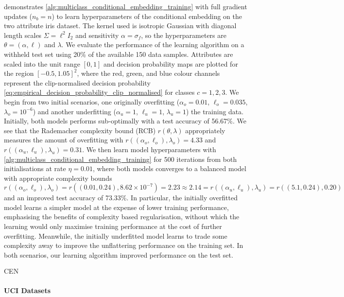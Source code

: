 \documentclass[twoside]{article}
\begin{document}
	 demonstrates \cref{alg:multiclass_conditional_embedding_training} with full gradient updates ($n_{b} = n$) to learn hyperparameters of the conditional embedding on the two attribute iris dataset. The kernel used is isotropic Gaussian with diagonal length scales $\Sigma = \ell^{2} I_{2}$ and sensitivity $\alpha = \sigma_{f}$, so the hyperparameters are $\theta = (\alpha, \ell)$ and $\lambda$. We evaluate the performance of the learning algorithm on a withheld test set using 20\% of the available 150 data samples. Attributes are scaled into the unit range $[0, 1]$ and decision probability maps are plotted for the region $[-0.5, 1.05]^{2}$, where the red, green, and blue colour channels represent the clip-normalised decision probability \eqref{eq:empirical_decision_probability_clip_normalised} for classes $c = 1, 2, 3$. We begin from two initial scenarios, one originally overfitting ($\alpha_{o} = 0.01$, $\ell_{o} = 0.035$, $\lambda_{o} = 10^{-6}$) and another underfitting ($\alpha_{u} = 1$, $\ell_{u} = 1$, $\lambda_{u} = 1$) the training data. Initially, both models performs sub-optimally with a test accuracy of 56.67\%. We see that the Rademacher complexity bound (RCB) $r(\theta, \lambda)$ appropriately measures the amount of overfitting with $r((\alpha_{o}, \ell_{o}), \lambda_{o}) = 4.33$ and $r((\alpha_{u}, \ell_{u}), \lambda_{u}) = 0.31$. We then learn model hyperparameters with \cref{alg:multiclass_conditional_embedding_training} for 500 iterations from both initialisations at rate $\eta = 0.01$, where both models converges to a balanced model with appropriate complexity bounds $r((\alpha_{o}, \ell_{o}), \lambda_{o}) = r((0.01, 0.24), 8.62 \times 10^{-7}) = 2.23 \approx 2.14 = r((\alpha_{u}, \ell_{u}), \lambda_{u}) = r((5.1, 0.24), 0.20)$ and an improved test accuracy of 73.33\%. In particular, the initially overfitted model learns a simpler model at the expense of lower training performance, emphasising the benefits of complexity based regularisation, without which the learning would only maximise training performance at the cost of further overfitting. Meanwhile, the initially underfitted model learns to trade some complexity away to improve the unflattering performance on the training set. In both scenarios, our learning algorithm improved performance on the test set.
	
	\gls{CEN}
	
	\paragraph{UCI Datasets}
	
\end{document}

